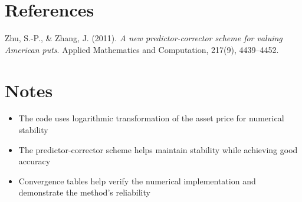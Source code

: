 \documentclass[12pt]{article}
\begin{document}
\section*{References}
Zhu, S.-P., \& Zhang, J. (2011). \textit{A new predictor-corrector scheme for valuing American puts}. Applied Mathematics and Computation, 217(9), 4439–4452.

\section*{Notes}
\begin{itemize}
  \item The code uses logarithmic transformation of the asset price for numerical stability
  \item The predictor-corrector scheme helps maintain stability while achieving good accuracy
  \item Convergence tables help verify the numerical implementation and demonstrate the method's reliability
\end{itemize}
\end{document}
